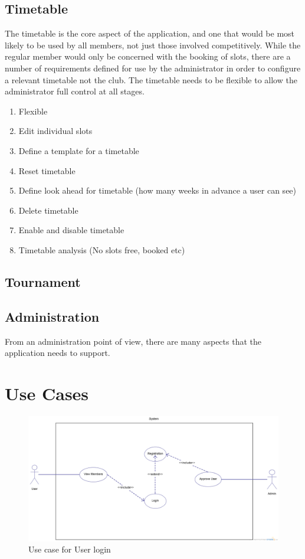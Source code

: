 \subsection{Timetable}

The timetable is the core aspect of the application, and one that would be most likely to be used by all members, not just those involved competitively. While the regular member would only be concerned with the booking of slots, there are a number of requirements defined for use by the administrator in order to configure a relevant timetable not the club. The timetable needs to be flexible to allow the administrator full control at all stages.

\begin{enumerate}
\item Flexible 
\item Edit individual slots
\item Define a template for a timetable
\item Reset timetable
\item Define look ahead for timetable (how many weeks in advance a user can see)
\item Delete timetable
\item Enable and disable timetable
\item Timetable analysis (No slots free, booked etc)
\end{enumerate}

\subsection{Tournament}

\subsection{Administration}

From an administration point of view, there are many aspects that the application needs to support. 

\section{Use Cases}

\begin{figure}[H]
\begin{center}
\includegraphics[width=14cm]{usecaselogin.png}
\end{center}
\caption{Use case for User login}
\label{fig:usecaselogin}
\end{figure}

